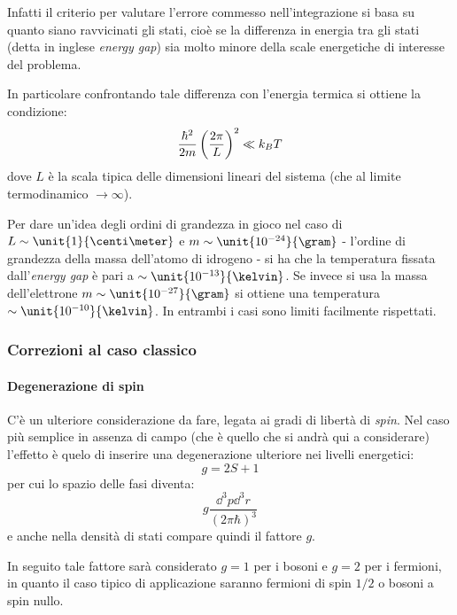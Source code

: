 Infatti il criterio per valutare l'errore commesso nell'integrazione si basa su quanto siano ravvicinati gli stati, cioè se la differenza in energia tra gli stati (detta in inglese \textit{energy gap}) sia molto minore della scale energetiche di interesse del problema.

In particolare confrontando tale differenza con l'energia termica si ottiene la condizione:
\begin{equation*}
	\frac{\hbar^2}{2m}\left(\frac{2\pi}{L}\right)^2 \ll k_B T
\end{equation*}
dove $L$ è la scala tipica delle dimensioni lineari del sistema (che al limite termodinamico $ \rightarrow \infty $).

\begin{es}
Per dare un'idea degli ordini di grandezza in gioco nel caso di $L \sim \unit{1}{\centi\meter}$ e $m \sim \unit{10^{-24}}{\gram}$ - l'ordine di grandezza della massa dell'atomo di idrogeno - si ha che la temperatura fissata dall'\textit{energy gap} è pari a $\sim \unit{10^{-13}}{\kelvin}$. Se invece si usa la massa dell'elettrone $m \sim \unit{10^{-27}}{\gram}$ si ottiene una temperatura $\sim \unit{10^{-10}}{\kelvin}$.
In entrambi i casi sono limiti facilmente rispettati.
\end{es}

\subsubsection{Correzioni al caso classico}

\paragraph{Degenerazione di spin} C'è un ulteriore considerazione da fare, legata ai gradi di libertà di \textit{spin}. Nel caso più semplice in assenza di campo (che è quello che si andrà qui a considerare) l'effetto è quelo di inserire una degenerazione ulteriore nei livelli energetici:
\begin{equation*}
g = 2S + 1
\end{equation*}
per cui lo spazio delle fasi diventa:
\begin{equation*}
g \frac{\dd ^3 p \dd ^3 r}{(2\pi \hbar)^3}
\end{equation*}
e anche nella densità di stati compare quindi il fattore $g$.

In seguito tale fattore sarà considerato $g=1$ per i bosoni e $g=2$ per i fermioni, in quanto il caso tipico di applicazione saranno fermioni di spin $1/2$ o bosoni a spin nullo.

